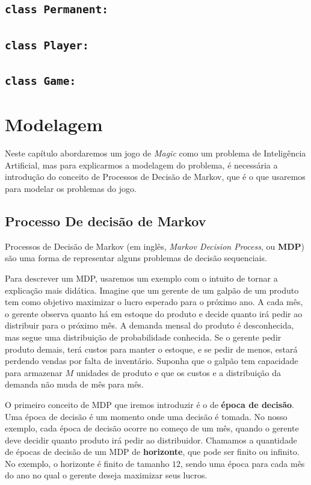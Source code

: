 \documentclass[dvipsnames]{book}
\begin{document}
\section{\texttt{class Permanent:}}


\section{\texttt{class Player:}}

\section{\texttt{class Game:}}

\pagebreak
\chapter{Modelagem}

Neste capítulo abordaremos um jogo de \textit{Magic} como um problema de Inteligência Artificial,
mas para explicarmos a modelagem do problema, é necessária a introdução do conceito de Processos
de Decisão de Markov, que é o que usaremos para modelar os problemas do jogo.

\section{Processo De decisão de Markov}
\label{ssec:mdp}

Processos de Decisão de Markov (em inglês, \textit{Markov Decision Process}, ou \textbf{MDP})
são uma forma de representar alguns problemas de decisão sequenciais.

Para descrever um MDP, usaremos um exemplo com o intuito de tornar a explicação mais didática.
Imagine que um gerente de um galpão de um produto tem como objetivo maximizar o lucro esperado
para o próximo ano. A cada mês, o gerente observa quanto há em estoque do produto e decide
quanto irá pedir ao distribuir para o próximo mês. A demanda mensal do produto é desconhecida,
mas segue uma distribuição de probabilidade conhecida. Se o gerente pedir produto demais, terá
custos para manter o estoque, e se pedir de menos, estará perdendo vendas por falta de inventário.
Suponha que o galpão tem capacidade para armazenar $M$ unidades de produto e que os custos e a
distribuição da demanda não muda de mês para mês.

O primeiro conceito de MDP que iremos introduzir é o de \textbf{época de decisão}. Uma época de
decisão é um momento onde uma decisão é tomada. No nosso exemplo, cada época de decisão ocorre
no começo de um mês, quando o gerente deve decidir quanto produto irá pedir ao distribuidor. Chamamos
a quantidade de épocas de decisão de um MDP de \textbf{horizonte}, que pode ser finito ou infinito.
No exemplo, o horizonte é finito de tamanho $12$, sendo uma época para cada mês do ano no qual o
gerente deseja maximizar seus lucros.
\end{document}
